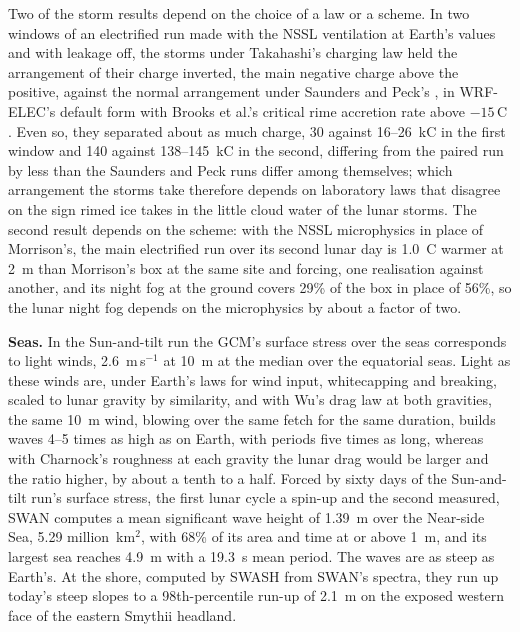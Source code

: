 Two of the storm results depend on the choice of a law or a scheme. In two windows of an electrified run made
with the NSSL ventilation at Earth's values and with leakage off, the storms under Takahashi's
charging law \autocite{takahashi1978riming} held the arrangement of their charge inverted, the main negative charge
above the positive, against the normal arrangement under Saunders and Peck's \autocite{saunders1998laboratory}, in
WRF-ELEC's default form with Brooks et al.'s critical rime accretion rate above $-15$\,\textdegree C
\autocite{mansell2026wrfelec}. Even so, they separated about as much charge, 30 against 16--26~kC in the first window and
140 against 138--145~kC in the second, differing from the paired run by less than the Saunders and Peck runs differ
among themselves; which arrangement the storms take therefore depends on laboratory laws that disagree on the sign
rimed ice takes in the little cloud water of the lunar storms. The second result depends on the scheme: with the
NSSL microphysics in place of Morrison's, the main electrified run over its second lunar day is 1.0~\textdegree C warmer at 2~m than Morrison's box at the
same site and forcing, one realisation against another, and its night fog at the ground covers 29\% of the box in
place of 56\%, so the lunar night fog depends on the microphysics by about a factor of two.

\textbf{Seas.} In the Sun-and-tilt run the GCM's surface stress over the seas corresponds to light winds, 2.6~m\,s$^{-1}$ at 10~m at the
median over the equatorial seas. Light as these winds are, under Earth's laws for wind input, whitecapping and
breaking, scaled to lunar gravity by similarity, and with Wu's drag law at both gravities, the same 10~m wind, blowing over the same fetch for the same duration, builds waves 4--5 times as high as on Earth, with periods five times as long, whereas with
Charnock's roughness at each gravity the lunar drag would be larger and the ratio higher, by about a tenth to a
half. Forced by sixty days of the
Sun-and-tilt run's surface stress, the first lunar cycle a spin-up and the second measured, SWAN computes a mean
significant wave height of 1.39~m over the Near-side Sea, 5.29 million~km$^2$, with 68\% of its area and time at or
above 1~m, and its largest sea reaches 4.9~m with a 19.3~s mean period. The waves are as steep as Earth's. At the
shore, computed by SWASH from SWAN's spectra, they run up today's steep slopes to a 98th-percentile run-up of 2.1~m on
the exposed western face of the eastern Smythii headland.
